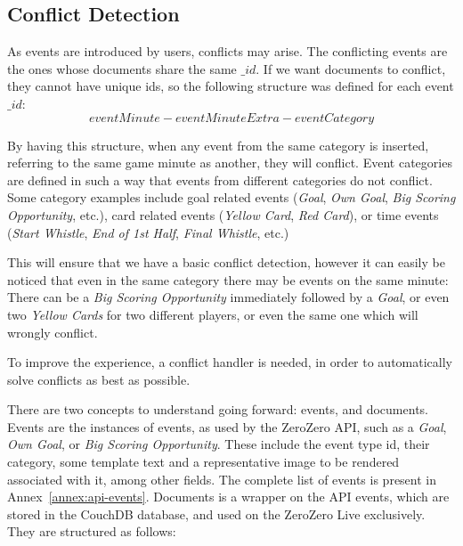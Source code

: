 \subsection{Conflict Detection}

As events are introduced by users, conflicts may arise. The conflicting events are the ones whose documents share the same $\_id$. If we want documents to conflict, they cannot have unique ids, so the following structure was defined for each event $\_id$:
\begin{equation}
    eventMinute-eventMinuteExtra-eventCategory
\end{equation}

By having this structure, when any event from the same category is inserted, referring to the same game minute as another, they will conflict. Event categories are defined in such a way that events from different categories do not conflict. Some category examples include goal related events (\textit{Goal}, \textit{Own Goal}, \textit{Big Scoring Opportunity}, etc.), card related events (\textit{Yellow Card}, \textit{Red Card}), or time events (\textit{Start Whistle}, \textit{End of 1st Half}, \textit{Final Whistle}, etc.)

This will ensure that we have a basic conflict detection, however it can easily be noticed that even in the same category there may be events on the same minute: There can be a \textit{Big Scoring Opportunity} immediately followed by a \textit{Goal}, or even two \textit{Yellow Cards} for two different players, or even the same one which will wrongly conflict.

To improve the experience, a conflict handler is needed, in order to automatically solve conflicts as best as possible.

There are two concepts to understand going forward: events, and documents. Events are the instances of events, as used by the ZeroZero API, such as a \textit{Goal}, \textit{Own Goal}, or \textit{Big Scoring Opportunity}. These include the event type id, their category, some template text and a representative image to be rendered associated with it, among other fields. The complete list of events is present in Annex~\ref{annex:api-events}. Documents is a wrapper on the API events, which are stored in the CouchDB database, and used on the ZeroZero Live exclusively. They are structured as follows:

